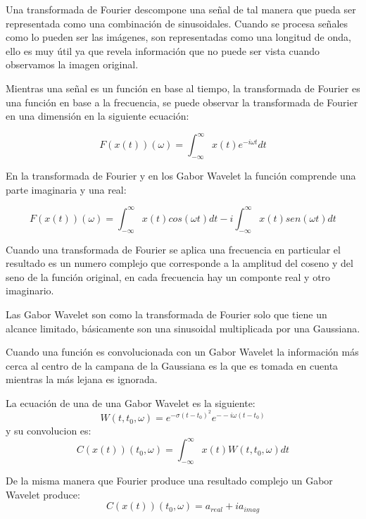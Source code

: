 Una transformada de Fourier descompone una señal de tal manera que pueda ser representada como una combinación de sinusoidales. Cuando se procesa señales como lo pueden ser las imágenes, son representadas como una longitud de onda, ello es muy útil ya que revela información que no puede ser vista cuando observamos la imagen original.

Mientras una señal es un función en base al tiempo, la transformada de Fourier es una función en base a la frecuencia, se puede observar la transformada de Fourier en una dimensión en la siguiente ecuación:

\begin{equation}
F(x(t))(\omega)=\int_{-\infty }^{\infty } x(t)e^{-i\omega t}dt
\end{equation}

En la transformada de Fourier y en los Gabor Wavelet la función comprende una parte imaginaria y una real:

\begin{equation}
F(x(t))(\omega)=\int_{-\infty }^{\infty } x(t)cos(\omega t)dt - i\int_{-\infty }^{\infty } x(t)sen(\omega t)dt
\end{equation}

Cuando una transformada de Fourier se aplica una frecuencia en particular el resultado es un numero complejo que corresponde a la amplitud del coseno y del seno de la función original, en cada frecuencia hay un componte real y otro imaginario.

Las Gabor Wavelet son como la transformada de Fourier solo que tiene un alcance limitado, básicamente son una sinusoidal multiplicada por una Gaussiana.

Cuando una función es convolucionada con un Gabor Wavelet la información más cerca al centro de la campana de la Gaussiana es la que es tomada en cuenta mientras la más lejana es ignorada.

La ecuación de una de una Gabor Wavelet es la siguiente:
\begin{equation}
W(t,t_0,\omega)=e^{-\sigma(t-t_0)^2} e^{--i\omega(t-t_0)}
\end{equation}
y su convolucion es:
\begin{equation}
C(x(t))(t_0,\omega)=\int_{-\infty}^{\infty}x(t)W(t,t_0,\omega)dt
\end{equation}

De la misma manera que Fourier produce una resultado complejo un Gabor Wavelet produce:
\begin{equation}
C(x(t))(t_0,\omega)=a_{real}+ia_{imag}
\label{ec:ConvolucionWavelet}
\end{equation}

